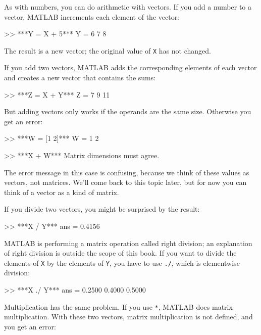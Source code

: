 As with numbers, you can do arithmetic with vectors.  If you add a number
to a vector, MATLAB increments each element of the vector:

\begin{code}
>> ***Y = X + 5***
Y = 6     7     8
\end{code}

\noindent The result is a new vector; the original value of \lstinline{X} has not
changed.

If you add two vectors, MATLAB adds the corresponding elements of each
vector and creates a new vector that contains the sums:

\begin{code}
>> ***Z = X + Y***
Z = 7     9    11
\end{code}

But adding vectors only works if the operands are the same size.
Otherwise you get an error:

\begin{code}
>> ***W = [1 2]***
W = 1     2     

>> ***X + W***
Matrix dimensions must agree.
\end{code}

\noindent The error message in this case is confusing, because we think of these values as vectors, not matrices.
We'll come back to this topic later, but for now you can think of a vector as a kind of matrix.


If you divide two vectors, you might be surprised by the result:

\begin{code}
>> ***X / Y***
ans = 0.4156
\end{code}

MATLAB is performing a matrix operation called right division; an explanation of right division is outside the scope of this book. If you want to divide the elements of \lstinline{X} by the elements of \lstinline{Y}, you have to use \lstinline{./}, which is elementwise division:

\begin{code}
>> ***X ./ Y***
ans = 0.2500    0.4000    0.5000
\end{code}

Multiplication has the same problem.  If you use \lstinline{*}, MATLAB does matrix multiplication.  With these two vectors, matrix multiplication is not defined, and you get an error:

